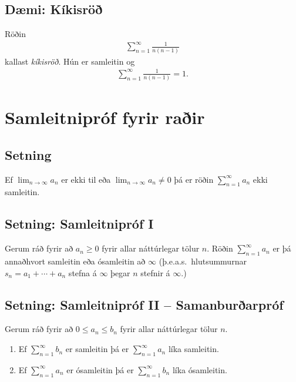 \documentclass[a4paper,10pt,icelandic]{sphinxmanual}
\begin{document}
\subsection{Dæmi: Kíkisröð}
\label{kafli09:daemi-kikisro}\label{kafli09:index-8}
Röðin
\begin{equation*}
\begin{split}\sum_{n=1}^\infty \frac{1}{n(n-1)}\end{split}
\end{equation*}
kallast \emph{kíkisröð}. Hún er samleitin og
\begin{equation*}
\begin{split}\sum_{n=1}^\infty \frac{1}{n(n-1)} =1.\end{split}
\end{equation*}

\section{Samleitnipróf fyrir raðir}
\label{kafli09:index-9}\label{kafli09:samleitniprof-fyrir-rair}

\subsection{Setning}
\label{kafli09:id9}
Ef \(\lim_{n\rightarrow\infty}a_n\) er ekki til eða
\(\lim_{n\rightarrow\infty}a_n\neq 0\) þá er röðin
\(\sum_{n=1}^\infty a_n\) ekki samleitin.


\subsection{Setning: Samleitnipróf I}
\label{kafli09:setning-samleitniprof-i}
Gerum ráð fyrir að \(a_n\geq 0\) fyrir allar náttúrlegar tölur
\(n\). Röðin \(\sum_{n=1}^\infty a_n\) er þá annaðhvort
samleitin eða ósamleitin að \(\infty\) (þ.e.a.s. hlutsummurnar
\(s_n=a_1+\cdots+a_n\) stefna á \(\infty\) þegar \(n\)
stefnir á \(\infty\).)


\subsection{Setning: Samleitnipróf II – Samanburðarpróf}
\label{kafli09:setning-samleitniprof-ii-samanburarprof}
Gerum ráð fyrir að \(0\leq a_n\leq b_n\) fyrir allar náttúrlegar
tölur \(n\).
\begin{enumerate}
\item {} 
Ef \(\sum_{n=1}^\infty b_n\) er samleitin þá er
\(\sum_{n=1}^\infty a_n\) líka samleitin.

\item {} 
Ef \(\sum_{n=1}^\infty a_n\) er ósamleitin þá er
\(\sum_{n=1}^\infty b_n\) líka ósamleitin.

\end{enumerate}
\end{document}
